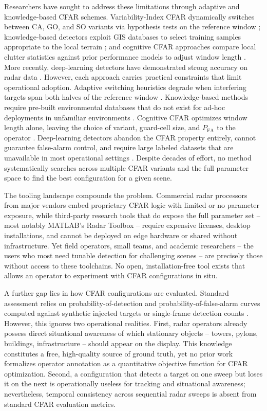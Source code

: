 \documentclass[conf]{new-aiaa}
\begin{document}
Researchers have sought to address these limitations through adaptive and knowledge-based CFAR schemes. Variability-Index CFAR dynamically switches between CA, GO, and SO variants via hypothesis tests on the reference window \cite{Smith2000}; knowledge-based detectors exploit GIS databases to select training samples appropriate to the local terrain \cite{DeMaio2007}; and cognitive CFAR approaches compare local clutter statistics against prior performance models to adjust window length \cite{Humphreys2022}. More recently, deep-learning detectors have demonstrated strong accuracy on radar data \cite{Wang2023}. However, each approach carries practical constraints that limit operational adoption. Adaptive switching heuristics degrade when interfering targets span both halves of the reference window \cite{Smith2000}. Knowledge-based methods require pre-built environmental databases that do not exist for ad-hoc deployments in unfamiliar environments \cite{DeMaio2007}. Cognitive CFAR optimizes window length alone, leaving the choice of variant, guard-cell size, and $P_{\mathrm{FA}}$ to the operator \cite{Humphreys2022}. Deep-learning detectors abandon the CFAR property entirely, cannot guarantee false-alarm control, and require large labeled datasets that are unavailable in most operational settings \cite{Diskin2024}. Despite decades of effort, no method systematically searches across multiple CFAR variants and the full parameter space to find the best configuration for a given scene.

The tooling landscape compounds the problem. Commercial radar processors from major vendors embed proprietary CFAR logic with limited or no parameter exposure, while third-party research tools that do expose the full parameter set -- most notably MATLAB's Radar Toolbox \cite{MathworksCFAR} -- require expensive licenses, desktop installations, and cannot be deployed on edge hardware or shared without infrastructure. Yet field operators, small teams, and academic researchers -- the users who most need tunable detection for challenging scenes -- are precisely those without access to these toolchains. No open, installation-free tool exists that allows an operator to experiment with CFAR configurations in situ.

A further gap lies in how CFAR configurations are evaluated. Standard assessment relies on probability-of-detection and probability-of-false-alarm curves computed against synthetic injected targets or single-frame detection counts \cite{Richards2022, Skolnik2008}. However, this ignores two operational realities. First, radar operators already possess direct situational awareness of which stationary objects -- towers, pylons, buildings, infrastructure -- should appear on the display. This knowledge constitutes a free, high-quality source of ground truth, yet no prior work formalizes operator annotation as a quantitative objective function for CFAR optimization. Second, a configuration that detects a target on one sweep but loses it on the next is operationally useless for tracking and situational awareness; nevertheless, temporal consistency across sequential radar sweeps is absent from standard CFAR evaluation metrics.
\end{document}

